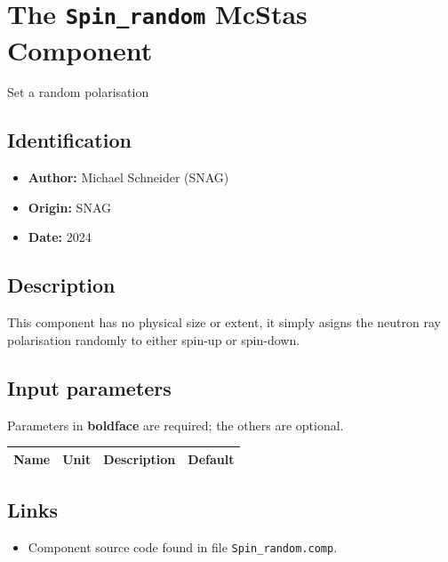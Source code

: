 \section{The \texttt{Spin\_random} McStas Component}
Set a random polarisation

\subsection*{Identification}
\begin{itemize}
  \item \textbf{Author:} Michael Schneider (SNAG)
  \item \textbf{Origin:} SNAG
  \item \textbf{Date:} 2024
\end{itemize}

\subsection*{Description}
This component has no physical size or extent, it simply asigns the neutron ray polarisation randomly to either spin-up or spin-down.

\subsection*{Input parameters}
Parameters in \textbf{boldface} are required; the others are optional.

\begin{longtable}{p{}p{}p{}p{}}
\toprule
\textbf{Name} & \textbf{Unit} & \textbf{Description} & \textbf{Default} \\
\midrule
\endhead
\bottomrule
\end{longtable}

\subsection*{Links}
\begin{itemize}
  \item Component source code found in file \texttt{Spin\_random.comp}.
\end{itemize}
